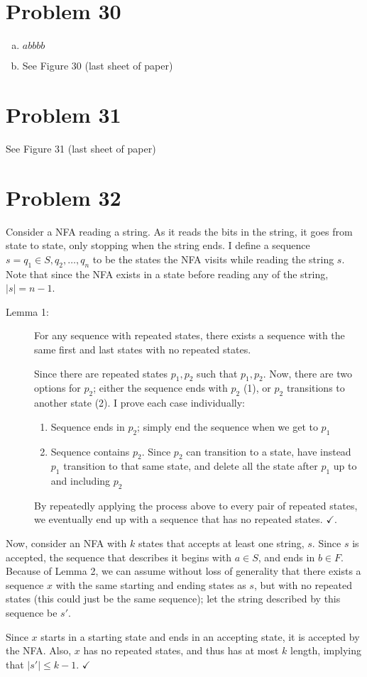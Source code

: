 \documentclass[11pt]{article}
\begin{document}
\section*{Problem 30}
\begin{enumerate}[(a)]
	\item $abbbb$
	\item See Figure 30 (last sheet of paper)
\end{enumerate}

\section*{Problem 31}
See Figure 31 (last sheet of paper)

\section*{Problem 32}
Consider a NFA reading a string. As it reads the bits in the string, it goes from state to state, only stopping when the string ends. I define a sequence $s = q_1 \in S, q_2, \dots, q_n$ to be the states the NFA visits while reading the string $s$. Note that since the NFA exists in a state before reading any of the string, $|s| = n-1$.

\begin{description}
\item[Lemma 1:]
For any sequence with repeated states, there exists a sequence with the same first and last states with no repeated states.

Since there are repeated states $p_1, p_2$ such that $p_1, p_2$. Now, there are two options for $p_2$; either the sequence ends with $p_2$ (1), or $p_2$ transitions to another state (2). I prove each case individually:
	\begin{enumerate}
		\item Sequence ends in $p_2$; simply end the sequence when we get to $p_1$
		\item Sequence contains $p_2$. Since $p_2$ can transition to a state, have instead $p_1$ transition to that same state, and delete all the state after $p_1$ up to and including $p_2$
	\end{enumerate}
	
By repeatedly applying the process above to every pair of repeated states, we eventually end up with a sequence that has no repeated states. $\checkmark$.
\end{description}

Now, consider an NFA with $k$ states that accepts at least one string, $s$. Since $s$ is accepted, the sequence that describes it begins with $a \in S$, and ends in $b \in F$. Because of Lemma 2, we can assume without loss of generality that there exists a sequence $x$ with the same starting and ending states as $s$, but with no repeated states (this could just be the same sequence); let the string described by this sequence be $s'$. 

Since $x$ starts in a starting state and ends in an accepting state, it is accepted by the NFA. Also, $x$ has no repeated states, and thus has at most $k$ length, implying that $|s'| \leq k -1$. $\checkmark$
\end{document}
